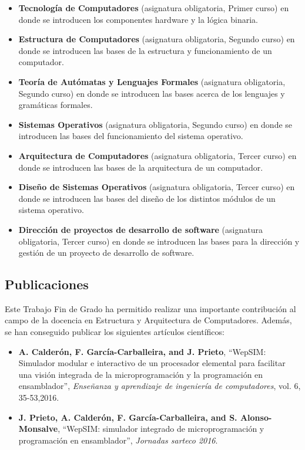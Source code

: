 \begin{itemize}

\item \textbf{Tecnología de Computadores} (asignatura obligatoria, Primer curso) en donde se introducen los componentes hardware y la lógica binaria.

\item \textbf{Estructura de Computadores} (asignatura obligatoria, Segundo curso) en donde se introducen las bases de la estructura y funcionamiento de un computador.

\item \textbf{Teoría de Autómatas y Lenguajes Formales} (asignatura obligatoria, Segundo curso) en donde se introducen las bases acerca de los lenguajes y gramáticas formales.

\item \textbf{Sistemas Operativos} (asignatura obligatoria, Segundo curso) en donde se introducen las bases del funcionamiento del sistema operativo.

\item \textbf{Arquitectura de Computadores} (asignatura obligatoria, Tercer curso) en donde se introducen las bases de la arquitectura de un computador.

\item \textbf{Diseño de Sistemas Operativos} (asignatura obligatoria, Tercer curso) en donde se introducen las bases del diseño de los distintos módulos de un sistema operativo.

\item \textbf{Dirección de proyectos de desarrollo de software} (asignatura obligatoria, Tercer curso) en donde se introducen las bases para la dirección y gestión de un proyecto de desarrollo de software.

\end{itemize}

\subsection{Publicaciones}

Este Trabajo Fin de Grado ha permitido realizar una importante contribución al campo de la docencia en Estructura y Arquitectura de Computadores. Además, se han conseguido publicar los siguientes artículos científicos:

\begin{itemize}

\item \textbf{A. Calderón, F. García-Carballeira, and J. Prieto}, “WepSIM: Simulador modular e interactivo de un procesador elemental para facilitar una visión integrada de la microprogramación y la programación en ensamblador”, \textit{Enseñanza y aprendizaje de ingeniería de computadores}, vol. 6, 35-53,2016. \cite{mateos2016wepsim}

\item \textbf{J. Prieto, A. Calderón, F. García-Carballeira, and S. Alonso-Monsalve}, “WepSIM: simulador integrado de microprogramación y programación en ensamblador”, \textit{Jornadas sarteco 2016}. \cite{arcos2032}

\end{itemize}

